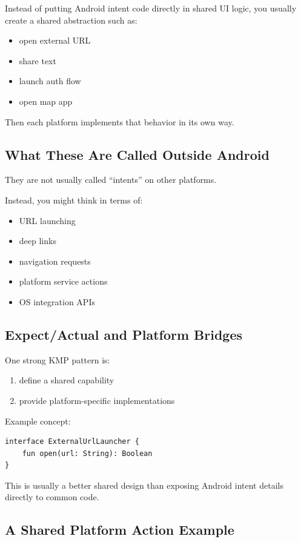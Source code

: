 \documentclass[11pt,a4paper]{article}
\begin{document}
Instead of putting Android intent code directly in shared UI logic, you usually create a shared abstraction such as:
\begin{itemize}
    \item open external URL
    \item share text
    \item launch auth flow
    \item open map app
\end{itemize}

Then each platform implements that behavior in its own way.

\subsection{What These Are Called Outside Android}

They are not usually called ``intents'' on other platforms.

Instead, you might think in terms of:
\begin{itemize}
    \item URL launching
    \item deep links
    \item navigation requests
    \item platform service actions
    \item OS integration APIs
\end{itemize}

\subsection{Expect/Actual and Platform Bridges}

One strong KMP pattern is:
\begin{enumerate}
    \item define a shared capability
    \item provide platform-specific implementations
\end{enumerate}

Example concept:

\begin{lstlisting}[style=kazekotlin]
interface ExternalUrlLauncher {
    fun open(url: String): Boolean
}
\end{lstlisting}

This is usually a better shared design than exposing Android intent details directly to common code.

\subsection{A Shared Platform Action Example}
\end{document}
